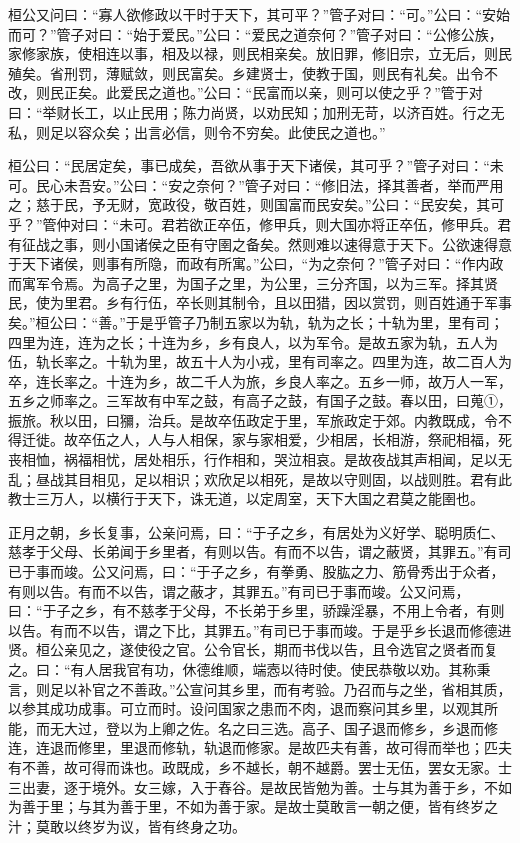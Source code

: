 \documentclass[]{article}
\begin{document}
桓公又问曰：``寡人欲修政以干时于天下，其可平？''管子对曰：``可。''公曰：``安始而可？''管子对曰：``始于爱民。''公曰：``爱民之道奈何？''管子对曰：``公修公族，家修家族，使相连以事，相及以禄，则民相亲矣。放旧罪，修旧宗，立无后，则民殖矣。省刑罚，薄赋敛，则民富矣。乡建贤士，使教于国，则民有礼矣。出令不改，则民正矣。此爱民之道也。''公曰：``民富而以亲，则可以使之乎？''管于对曰：``举财长工，以止民用；陈力尚贤，以劝民知；加刑无苛，以济百姓。行之无私，则足以容众矣；出言必信，则令不穷矣。此使民之道也。''

桓公曰：``民居定矣，事已成矣，吾欲从事于天下诸侯，其可乎？''管子对曰：``未可。民心未吾安。''公曰：``安之奈何？''管子对曰：``修旧法，择其善者，举而严用之；慈于民，予无财，宽政役，敬百姓，则国富而民安矣。''公曰：``民安矣，其可乎？''管仲对曰：``未可。君若欲正卒伍，修甲兵，则大国亦将正卒伍，修甲兵。君有征战之事，则小国诸侯之臣有守圉之备矣。然则难以速得意于天下。公欲速得意于天下诸侯，则事有所隐，而政有所寓。''公曰，``为之奈何？''管子对曰：``作内政而寓军令焉。为高子之里，为国子之里，为公里，三分齐国，以为三军。择其贤民，使为里君。乡有行伍，卒长则其制令，且以田猎，因以赏罚，则百姓通于军事矣。''桓公曰：``善。''于是乎管子乃制五家以为轨，轨为之长；十轨为里，里有司；四里为连，连为之长；十连为乡，乡有良人，以为军令。是故五家为轨，五人为伍，轨长率之。十轨为里，故五十人为小戎，里有司率之。四里为连，故二百人为卒，连长率之。十连为乡，故二千人为旅，乡良人率之。五乡一师，故万人一军，五乡之师率之。三军故有中军之鼓，有高子之鼓，有国子之鼓。春以田，曰蒐①，振旅。秋以田，曰獼，治兵。是故卒伍政定于里，军旅政定于郊。内教既成，令不得迁徙。故卒伍之人，人与人相保，家与家相爱，少相居，长相游，祭祀相福，死丧相恤，祸福相忧，居处相乐，行作相和，哭泣相哀。是故夜战其声相闻，足以无乱；昼战其目相见，足以相识；欢欣足以相死，是故以守则固，以战则胜。君有此教士三万人，以横行于天下，诛无道，以定周室，天下大国之君莫之能圉也。

正月之朝，乡长复事，公亲问焉，曰：``于子之乡，有居处为义好学、聪明质仁、慈孝于父母、长弟闻于乡里者，有则以告。有而不以告，谓之蔽贤，其罪五。''有司已于事而竣。公又问焉，曰：``于子之乡，有拳勇、股肱之力、筋骨秀出于众者，有则以告。有而不以告，谓之蔽才，其罪五。''有司已于事而竣。公又问焉，曰：``于子之乡，有不慈孝于父母，不长弟于乡里，骄躁淫暴，不用上令者，有则以告。有而不以告，谓之下比，其罪五。''有司已于事而竣。于是乎乡长退而修德进贤。桓公亲见之，遂使役之官。公令官长，期而书伐以告，且令选官之贤者而复之。曰：``有人居我官有功，休德维顺，端悫以待时使。使民恭敬以劝。其称秉言，则足以补官之不善政。''公宣问其乡里，而有考验。乃召而与之坐，省相其质，以参其成功成事。可立而时。设问国家之患而不肉，退而察问其乡里，以观其所能，而无大过，登以为上卿之佐。名之曰三选。高子、国子退而修乡，乡退而修连，连退而修里，里退而修轨，轨退而修家。是故匹夫有善，故可得而举也；匹夫有不善，故可得而诛也。政既成，乡不越长，朝不越爵。罢士无伍，罢女无家。士三出妻，逐于境外。女三嫁，入于舂谷。是故民皆勉为善。士与其为善于乡，不如为善于里；与其为善于里，不如为善于家。是故士莫敢言一朝之便，皆有终岁之汁；莫敢以终岁为议，皆有终身之功。
\end{document}
